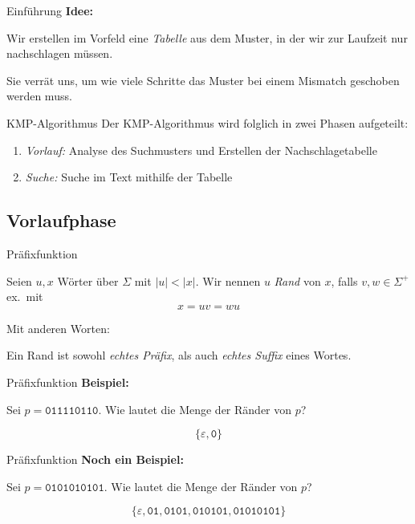 \documentclass[xcolor=dvipsnames, aspectratio=169]{beamer}
\begin{document}
\begin{frame}{Einführung}
\textbf{Idee:}\medskip

Wir erstellen im Vorfeld eine \textit{Tabelle} aus dem Muster, in der wir zur Laufzeit nur nachschlagen müssen.\medskip

Sie verrät uns, um wie viele Schritte das Muster bei einem Mismatch geschoben werden muss.
\end{frame}

\begin{frame}{KMP-Algorithmus}
Der KMP-Algorithmus wird folglich in zwei Phasen aufgeteilt:\bigskip

\begin{enumerate}[1.]
\item \textit{Vorlauf:} Analyse des Suchmusters und Erstellen der Nachschlagetabelle
\item \textit{Suche:} Suche im Text mithilfe der Tabelle
\end{enumerate}
\end{frame}

\subsection{Vorlaufphase}

\begin{frame}{Präfixfunktion}
\begin{defi}
Seien $u,x$ Wörter über $\Sigma$ mit $\vert u\vert <\vert x\vert$. Wir nennen $u$ \textit{Rand} von $x$, falls $v,w\in\Sigma^+$ ex.\ mit \[x=uv=wu\]
\end{defi}
\pause\bigskip
Mit anderen Worten:\smallskip

Ein Rand ist sowohl \emph{echtes Präfix}, als auch \emph{echtes Suffix} eines Wortes.
\end{frame}

\begin{frame}{Präfixfunktion}
\textbf{Beispiel:}\bigskip

Sei $p=\texttt{011110110}$. Wie lautet die Menge der Ränder von $p$?\pause

\[\{\varepsilon,\texttt{0}\}\]
\end{frame}

\begin{frame}{Präfixfunktion}
\textbf{Noch ein Beispiel:}\bigskip

Sei $p=\texttt{0101010101}$. Wie lautet die Menge der Ränder von $p$?\pause

\[\{\varepsilon,\texttt{01},\texttt{0101},\texttt{010101},\texttt{01010101}\}\]
\end{frame}
\end{document}
